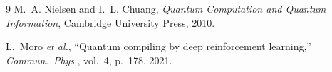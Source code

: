\documentclass[conference]{IEEEtran}
\begin{document}



\begin{thebibliography}{9}
M.~A. Nielsen and I.~L. Chuang,
\textit{Quantum Computation and Quantum Information},
Cambridge University Press, 2010.

L.~Moro \textit{et al.},
``Quantum compiling by deep reinforcement learning,''
\textit{Commun.\ Phys.}, vol.~4, p.~178, 2021.
\end{thebibliography}
\end{document}
